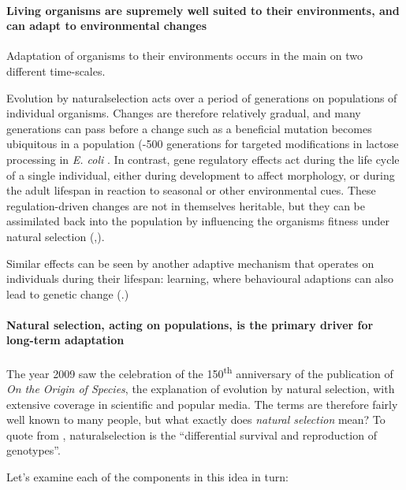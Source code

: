 \paragraph{Living organisms are supremely well suited to their environments, and can adapt to environmental changes}

Adaptation of organisms to their environments occurs in the main on two different time-scales.

Evolution by \gls{naturalselection} acts over a period of generations on populations of individual organisms. Changes are therefore relatively gradual, and many generations can pass before a change such as a beneficial mutation becomes ubiquitous in a population (-500 generations for targeted modifications in lactose processing in \emph{E. coli} \parencite{Dekel:2005fk}. In contrast, gene regulatory effects act during the life cycle of a single individual, either during development to affect morphology, or during the adult lifespan in reaction to seasonal or other environmental cues. These regulation-driven changes are not in themselves heritable, but they can be assimilated back into the population by influencing the organisms fitness under natural selection (\eg,\parencite{Baldwin:1896ly,Dennett:2003ve,Paenke:2009xe,Paenke:2007ve}).

Similar effects can be seen by another adaptive mechanism that operates on individuals during their lifespan: learning, where behavioural adaptions can also lead to genetic change (\eg \parencite{Hinton:1987vy}.)

\paragraph{Natural selection, acting on populations, is the primary driver for long-term adaptation}

The year 2009 saw the celebration of the 150\textsuperscript{th} anniversary of the publication of \emph{On the Origin of Species}, the explanation of evolution by natural selection, with extensive coverage in scientific and popular media. The terms are therefore fairly well known to many people, but what exactly does \emph{natural selection} mean? To quote from \parencite{Futuyama:1979tg}, \gls{naturalselection} is the ``differential survival and reproduction of genotypes''.

Let's examine each of the components in this idea in turn:

